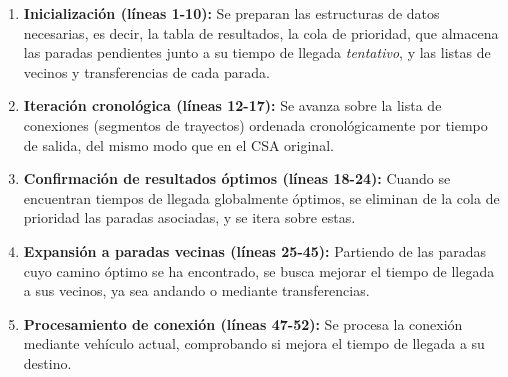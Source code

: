 \begin{enumerate}
    \item \textbf{Inicialización (líneas 1-10):} Se preparan las estructuras de datos necesarias, es decir, la tabla de resultados, la cola de prioridad, que almacena las paradas pendientes junto a su tiempo de llegada \textit{tentativo}, y las listas de vecinos y transferencias de cada parada.
    \item \textbf{Iteración cronológica (líneas 12-17):} Se avanza sobre la lista de conexiones (segmentos de trayectos) ordenada cronológicamente por tiempo de salida, del mismo modo que en el CSA original.
    \item \textbf{Confirmación de resultados óptimos (líneas 18-24):} Cuando se encuentran tiempos de llegada globalmente óptimos, se eliminan de la cola de prioridad las paradas asociadas, y se itera sobre estas.
    \item \textbf{Expansión a paradas vecinas (líneas 25-45):} Partiendo de las paradas cuyo camino óptimo se ha encontrado, se busca mejorar el tiempo de llegada a sus vecinos, ya sea andando o mediante transferencias.
    \item \textbf{Procesamiento de conexión (líneas 47-52):} Se procesa la conexión mediante vehículo actual, comprobando si mejora el tiempo de llegada a su destino.
\end{enumerate}

